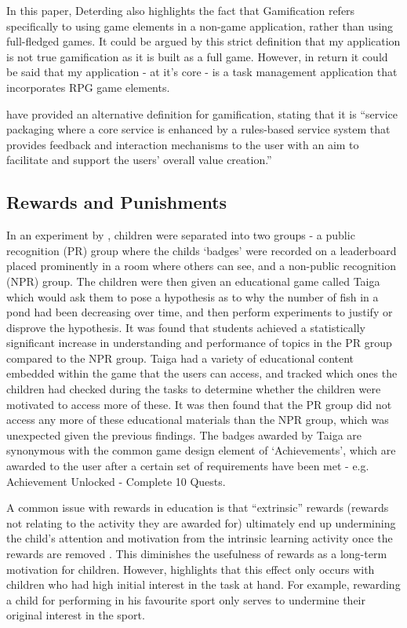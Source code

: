 In this paper, Deterding also highlights the fact that Gamification refers specifically to using game elements in a non-game application, rather than using full-fledged games.
It could be argued by this strict definition that my application is not true gamification as it is built as a full game.
However, in return it could be said that my application - at it's core - is a task management application that incorporates RPG game elements.

\cite{huotari2011gamification} have provided an alternative definition for gamification, stating that it is ``service packaging where a core service is enhanced by a rules-based service system that provides feedback and interaction mechanisms to the user with an aim to facilitate and support the users’ overall value creation.''

\subsection{Rewards and Punishments}
In an experiment by \cite{Filsecker2014136}, children were separated into two groups - a public recognition (PR) group where the childs `badges' were recorded on a leaderboard placed prominently in a room where others can see, and a non-public recognition (NPR) group.
The children were then given an educational game called Taiga which would ask them to pose a hypothesis as to why the number of fish in a pond had been decreasing over time, and then perform experiments to justify or disprove the hypothesis.
It was found that students achieved a statistically significant increase in understanding and performance of topics in the PR group compared to the NPR group.
Taiga had a variety of educational content embedded within the game that the users can access, and tracked which ones the children had checked during the tasks to determine whether the children were motivated to access more of these. 
It was then found that the PR group did not access any more of these educational materials than the NPR group, which was unexpected given the previous findings. 
The badges awarded by Taiga are synonymous with the common game design element of `Achievements', which are awarded to the user after a certain set of requirements have been met - e.g. Achievement Unlocked - Complete 10 Quests.

A common issue with rewards in education is that ``extrinsic'' rewards (rewards not relating to the activity they are awarded for) ultimately end up undermining the child's attention and motivation from the intrinsic learning activity once the rewards are removed \citep{deci2001extrinsic,ACP:ACP2350090502}.
This diminishes the usefulness of rewards as a long-term motivation for children.
However, \cite{cameron2001negative} highlights that this effect only occurs with children who had high initial interest in the task at hand. 
For example, rewarding a child for performing in his favourite sport only serves to undermine their original interest in the sport.

